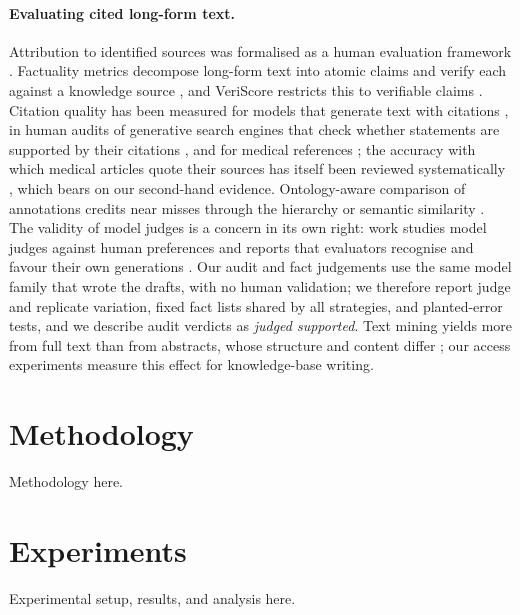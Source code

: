 \documentclass{article} %
\begin{document}
\paragraph{Evaluating cited long-form text.}
Attribution to identified sources was formalised as a human evaluation framework \citep{Rashkin2021MeasuringAttribution}. Factuality metrics decompose long-form text into atomic claims and verify each against a knowledge source \citep{min2023factscore,wei2024longform}, and VeriScore restricts this to verifiable claims \citep{Song2024VeriscoreEvaluating}. Citation quality has been measured for models that generate text with citations \citep{gao2023enabling}, in human audits of generative search engines that check whether statements are supported by their citations \citep{Liu2023EvaluatingVerifiability}, and for medical references \citep{wu2025automated}; the accuracy with which medical articles quote their sources has itself been reviewed systematically \citep{jergas2015quotation}, which bears on our second-hand evidence. Ontology-aware comparison of annotations credits near misses through the hierarchy or semantic similarity \citep{Verspoor2006CategorizationApproach,Khler2009ClinicalDiagnostics}. The validity of model judges is a concern in its own right: work studies model judges against human preferences \citep{zheng2023judging,shankar2024who} and reports that evaluators recognise and favour their own generations \citep{panickssery2024llm}. Our audit and fact judgements use the same model family that wrote the drafts, with no human validation; we therefore report judge and replicate variation, fixed fact lists shared by all strategies, and planted-error tests, and we describe audit verdicts as \emph{judged supported}. Text mining yields more from full text than from abstracts, whose structure and content differ \citep{Cohen2010StructuralContent,Westergaard2018ComprehensiveQuantitative}; our access experiments measure this effect for knowledge-base writing.

\section{Methodology}
\label{sec:method}
Methodology here.

\section{Experiments}
\label{sec:experiments}
Experimental setup, results, and analysis here.
\end{document}
